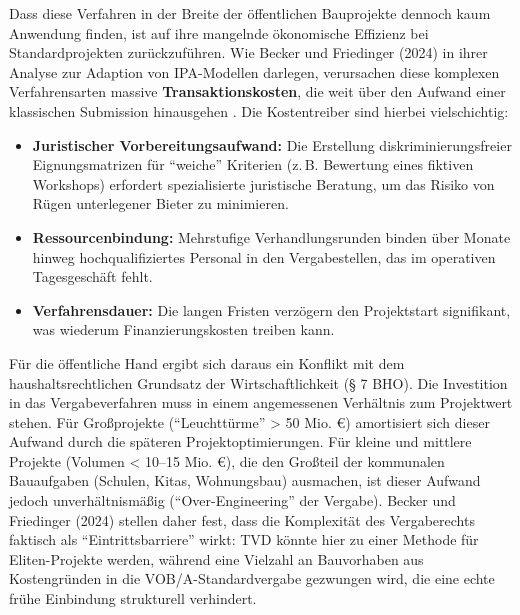 Dass diese Verfahren in der Breite der öffentlichen Bauprojekte dennoch kaum Anwendung finden, ist auf ihre mangelnde ökonomische Effizienz bei Standardprojekten zurückzuführen. Wie Becker und Friedinger (2024) in ihrer Analyse zur Adaption von \acs{IPA}-Modellen darlegen, verursachen diese komplexen Verfahrensarten massive \textbf{Transaktionskosten}, die weit über den Aufwand einer klassischen Submission hinausgehen \autocite[Vgl.][S.~5]{becker_adaptionen_2024}.
Die Kostentreiber sind hierbei vielschichtig:
\begin{itemize}
    \item \textbf{Juristischer Vorbereitungsaufwand:} Die Erstellung diskriminierungsfreier Eignungsmatrizen für \enquote{weiche} Kriterien (z.\,B. Bewertung eines fiktiven Workshops) erfordert spezialisierte juristische Beratung, um das Risiko von Rügen unterlegener Bieter zu minimieren.
    \item \textbf{Ressourcenbindung:} Mehrstufige Verhandlungsrunden binden über Monate hinweg hochqualifiziertes Personal in den Vergabestellen, das im operativen Tagesgeschäft fehlt.
    \item \textbf{Verfahrensdauer:} Die langen Fristen verzögern den Projektstart signifikant, was wiederum Finanzierungskosten treiben kann.
\end{itemize}

Für die öffentliche Hand ergibt sich daraus ein Konflikt mit dem haushaltsrechtlichen Grundsatz der Wirtschaftlichkeit (§ 7 BHO). Die Investition in das Vergabeverfahren muss in einem angemessenen Verhältnis zum Projektwert stehen.\autocite[Vgl.][§~7]{bho_bundeshaushaltsordnung_1969}
Für Großprojekte (\enquote{Leuchttürme} > 50 Mio. €) amortisiert sich dieser Aufwand durch die späteren Projektoptimierungen. Für kleine und mittlere Projekte (Volumen < 10--15 Mio. €), die den Großteil der kommunalen Bauaufgaben (Schulen, Kitas, Wohnungsbau) ausmachen, ist dieser Aufwand jedoch unverhältnismäßig (\enquote{Over-Engineering} der Vergabe). \autocite[Vgl.][S.~7]{becker_adaptionen_2024}
Becker und Friedinger (2024) stellen daher fest, dass die Komplexität des Vergaberechts faktisch als \enquote{Eintrittsbarriere} wirkt: \acs{TVD} könnte hier zu einer Methode für Eliten-Projekte werden, während eine Vielzahl an Bauvorhaben aus Kostengründen in die \acs{VOB}/A-Standardvergabe gezwungen wird, die eine echte frühe Einbindung strukturell verhindert.\autocite[Vgl.][S.~6]{becker_adaptionen_2024}

